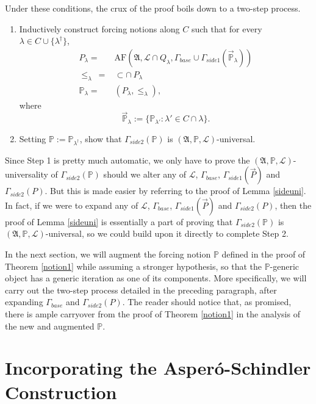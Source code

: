 \documentclass[12pt, twoside]{memoir}
\numberwithin{equation}{section}
\theoremstyle{definition}
\theoremstyle{remark}
\theoremstyle{definition}
\theoremstyle{definition}
\theoremstyle{definition}
\theoremstyle{remark}
\begin{document}
Under these conditions, the crux of the proof boils down to a two-step process.
\begin{enumerate}[leftmargin=50pt, label=Step \arabic*:]
    \item\label{remstep1} Inductively construct forcing notions along $C$ such that for every $\lambda \in C \cup \{\lambda^{\dagger}\}$, 
    \begin{align*}
        P_{\lambda} = \ & \mathrm{AF}(\mathfrak{A}, \mathcal{L} \cap Q_{\lambda}, \Gamma_{base} \cup \Gamma_{side1}(\Vec{\mathbb{P}}_{\lambda})) \\
        \leq_{\lambda} \ = & \subset \cap \ P_{\lambda} \\
        \mathbb{P}_{\lambda} = \ & (P_{\lambda}, \leq_{\lambda}) \text{,}
    \end{align*}
    where $$\Vec{\mathbb{P}}_{\lambda} := \{\mathbb{P}_{\lambda'} : \lambda' \in C \cap \lambda\} \text{.}$$
    \item Setting $\mathbb{P} := \mathbb{P}_{\lambda^{\dagger}}$, show that $\Gamma_{side2}(\mathbb{P})$ is $(\mathfrak{A}, \mathbb{P}, \mathcal{L})$-universal.
\end{enumerate}
Since Step 1 is pretty much automatic, we only have to prove the $(\mathfrak{A}, \mathbb{P}, \mathcal{L})$-universality of $\Gamma_{side2}(\mathbb{P})$ should we alter any of $\mathcal{L}$, $\Gamma_{base}$, $\Gamma_{side1}(\Vec{P})$ and $\Gamma_{side2}(P)$. But this is made easier by referring to the proof of Lemma \ref{sideuni}. In fact, if we were to expand any of $\mathcal{L}$, $\Gamma_{base}$, $\Gamma_{side1}(\Vec{P})$ and $\Gamma_{side2}(P)$, then the proof of Lemma \ref{sideuni} is essentially a part of proving that $\Gamma_{side2}(\mathbb{P})$ is $(\mathfrak{A}, \mathbb{P}, \mathcal{L})$-universal, so we could build upon it directly to complete Step 2. 

In the next section, we will augment the forcing notion $\mathbb{P}$ defined in the proof of Theorem \ref{notion1} while assuming a stronger hypothesis, so that the $\mathbb{P}$-generic object has a generic iteration as one of its components. More specifically, we will carry out the two-step process detailed in the preceding paragraph, after expanding $\Gamma_{base}$ and $\Gamma_{side2}(P)$. The reader should notice that, as promised, there is ample carryover from the proof of Theorem \ref{notion1} in the analysis of the new and augmented $\mathbb{P}$.

\section{Incorporating the Asper\'{o}-Schindler Construction}\label{ss43}
\end{document}
